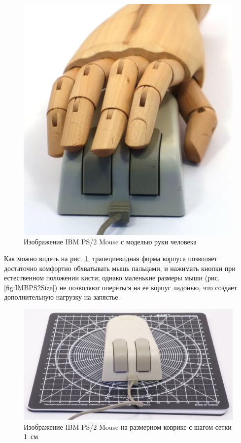 \documentclass[11pt, a4paper]{article}
\begin{document}
\begin{figure}[h]
    \centering
    \includegraphics[scale=0.4]{1987_ibm_ps2_mouse/num3.JPG}
    \caption{Изображение IBM PS/2 Mouse с моделью руки человека}
    \label{fig:IMBPS2Hand}
\end{figure}

Как можно видеть на рис. \ref{fig:IMBPS2Hand}, трапециевидная форма корпуса позволяет достаточно комфортно обхватывать мышь пальцами, и нажимать кнопки при естественном положении кисти; однако маленькие размеры мыши (рис. \ref{fig:IMBPS2Size}) не позволяют опереться на ее корпус ладонью, что создает дополнительную нагрузку на запястье.

\begin{figure}[h]
    \centering
    \includegraphics[scale=0.34]{1987_ibm_ps2_mouse/num4.jpg}
    \caption{Изображение IBM PS/2 Mouse на размерном коврике с шагом сетки 1~см}
    \label{fig:IBMPS2Size}
\end{figure}
\end{document}
